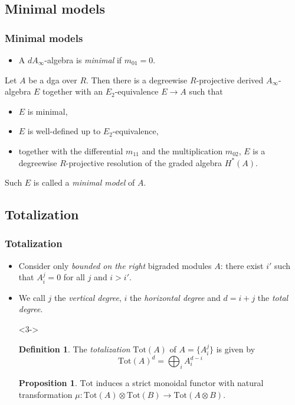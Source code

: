 \documentclass{beamer}
\theoremstyle{definition}
\newtheorem{defi}{Definition}
\newtheorem{prop}[theo]{Proposition}
\newcommand{\Tot}{\mathrm{Tot}}
\begin{document}
\subsection{Minimal models}
\begin{frame}
\frametitle{Minimal models}
\begin{itemize}
\item A $dA_\infty$-algebra is \emph{minimal} if $m_{01} = 0$. 
\end{itemize}\pause
\begin{theorem}[Sagave]
Let $A$ be a dga over $R$. Then there is a degreewise
$R$-projective derived $A_\infty$-algebra $E$ together with an $E_2$-equivalence $E \to A$ such that
\begin{itemize}
\item $E$ is minimal,
\item $E$ is well-defined up to $E_2$-equivalence,
\item together with the differential $m_{11}$ and the multiplication $m_{02}$, $E$ is a degreewise $R$-projective
resolution of the graded algebra $H^*(A)$. 
\end{itemize}
\end{theorem}\pause
Such $E$ is called a \emph{minimal model} of $A$.
\end{frame}

\subsection{Totalization}
\begin{frame}
\frametitle{Totalization}
\begin{itemize}
\item<1-> Consider only \emph{bounded on the right} bigraded modules $A$: there exist $i'$ such that $A_i^j=0$ for all $j$ and $i>i'$. %
\item<2-> We call $j$ the \emph{vertical degree}, $i$ the \emph{horizontal degree} and $d=i+j$ the \emph{total degree}.
\item[]<3->
\begin{defi}
The \emph{totalization} $\Tot(A)$ of $A = \{A^j_i \}$ is given by
\[\Tot(A)^d =
\bigoplus_{i}A^{d-i}_i \]%
\end{defi}\pause
\begin{prop}
$\Tot$ induces a strict monoidal functor with natural transformation $\mu:\Tot(A)\otimes\Tot(B)\to\Tot(A\otimes B)$.
\end{prop}
\end{itemize}
\end{frame}
\end{document}
